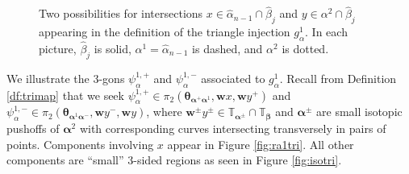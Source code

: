 \documentclass[11pt]{article}
\theoremstyle{plain} \newtheorem{thm}{Theorem}[subsection]
\theoremstyle{plain} \newtheorem{cor}[thm]{Corollary}
\theoremstyle{plain} \newtheorem{prop}[thm]{Proposition}
\theoremstyle{plain} \newtheorem{conj}[thm]{Conjecture}
\theoremstyle{plain} \newtheorem{lem}[thm]{Lemma}
\theoremstyle{definition} \newtheorem{df}[thm]{Definition}
\theoremstyle{remark} \newtheorem{rmk}[thm]{Remark}
\theoremstyle{remark} \newtheorem{obs}[thm]{Observation}
\newcommand{\ah}{\widehat{\alpha}}
\newcommand{\bh}{\widehat{\beta}}
\newcommand{\ba}{\boldsymbol{\alpha}}
\newcommand{\bb}{\boldsymbol{\beta}}
\newcommand{\bw}{\mathbf{w}}
\newcommand{\tor}[1]{\mathbb{T}_{#1}}
\numberwithin{equation}{section}
\begin{document}
\begin{figure}[h]
\centering
\begin{minipage}[c]{.55\linewidth}
\quad
{}
\end{minipage}
\begin{minipage}[c]{.40\linewidth}
\caption[Possible inputs for $g_{\alpha}^1$ in Lemma \ref{lem:RredR}]{ Two possibilities for intersections $x \in \ah_{n-1}\cap\bh_{j}$ and $y \in \alpha^2 \cap \bh_j$ appearing in the definition of the triangle injection $g_{\alpha}^1$.  In each picture, $\bh_j$ is solid, $\alpha^1 = \ah_{n-1}$ is dashed, and $\alpha^2$ is dotted.\label{fig:ra1}}
\end{minipage}
\end{figure}

We illustrate the 3-gons $\psi_{\alpha}^{1,+}$ and $\psi_{\alpha}^{1,-}$ associated to $g_{\alpha}^1$.  Recall from Definition \ref{df:trimap} that we seek $\psi_{\alpha}^{1,+} \in \pi_2(\boldsymbol{\theta}_{\ba^{+}\ba^1}, \bw x, \bw y^+)$ and $\psi_{\alpha}^{1,-} \in \pi_2(\boldsymbol{\theta}_{\ba^1\ba^{-}}, \bw y^{-}, \bw y)$, where $\bw^{\pm} y^\pm \in \tor{\ba^{\pm}} \cap \tor{\bb}$ and $\ba^{\pm}$ are small isotopic pushoffs of $\ba^2$ with corresponding curves intersecting transversely in pairs of points.  Components involving $x$ appear in Figure \ref{fig:ra1tri}.  All other components are ``small'' 3-sided regions as seen in Figure \ref{fig:isotri}.
\end{document}
